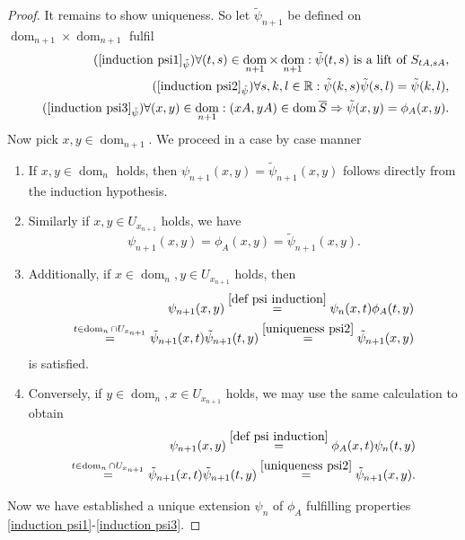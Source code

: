 \documentclass[b5paper,draft,openbib,12pt]{memoir}
\DeclareMathOperator{\dom}{dom}
\begin{document}
\begin{proof}
It remains to show uniqueness. 
So let \(\tilde{\psi}_{n+1}\) be defined 
on \(\dom_{n+1}\times\dom_{n+1}\) fulfil 
 \begin{align}\label{uniqueness psi1}\tag{\(\ref{induction psi1}_{\tilde{\psi}}\)}
  \forall (t,s)\in \dom_{n+1}\times \dom_{n+1}: \tilde{\psi}(t,s) \text{ is a lift of } S_{tA, sA},\\\label{uniqueness psi2}\tag{\(\ref{induction psi2}_{\tilde{\psi}}\)}
\forall s,k,l\in\mathbb{R}: \tilde{\psi}(k,s)\tilde{\psi}(s,l)=\tilde{\psi}(k,l),\\\label{uniqueness psi3}\tag{\(\ref{induction psi3}_{\tilde{\psi}}\)}
\forall (x,y)\in\dom_{n+1}: (xA, yA)\in\dom\overline{S}\Rightarrow  \tilde{\psi}(x,y)=\phi_A(x,y).
\end{align}
Now pick \(x,y \in \dom_{n+1}\). We proceed 
in a case by case manner
\begin{enumerate}
\item If \(x,y\in\dom_n\) holds, then 
\(\psi_{n+1}(x,y)=\tilde{\psi}_{n+1}(x,y)\) follows directly
from the induction hypothesis.
\item Similarly if \(x,y\in U_{x_{n+1}}\) holds, we have
\begin{equation}
  \psi_{n+1}(x,y)=\phi_A(x,y)=\tilde{\psi}_{n+1}(x,y).
\end{equation}
\item Additionally, if 
\(x\in \dom_n, y \in U_{x_{n+1}}\) holds, then 
\begin{align}
\psi_{n+1}(x,y)
\overset{\eqref{def psi induction}}{=}
\psi_{n}(x,t)\phi_{A}(t,y)\\
\overset{t\in \dom_n\cap U_{x_{n+1}}}{=}\tilde{\psi}_{n+1}(x,t)\tilde{\psi}_{n+1}(t,y)
\overset{\eqref{uniqueness psi2}}{=}
\tilde{\psi}_{n+1}(x,y)
\end{align}
is satisfied. 
\item Conversely, if 
\(y\in \dom_n, x \in U_{x_{n+1}}\) holds, we may 
use the same calculation to obtain 
\begin{align}
\psi_{n+1}(x,y)
\overset{\eqref{def psi induction}}{=}
\phi_{A}(x,t)\psi_{n}(t,y)\\
\overset{t\in \dom_n\cap U_{x_{n+1}}}{=}\tilde{\psi}_{n+1}(x,t)\tilde{\psi}_{n+1}(t,y)
\overset{\eqref{uniqueness psi2}}{=}
\tilde{\psi}_{n+1}(x,y).
\end{align}
\end{enumerate}

Now we have established a unique extension \(\psi_n\) of \(\phi_A\)
fulfilling properties \eqref{induction psi1}-\eqref{induction psi3}.


\end{proof}
\end{document}
